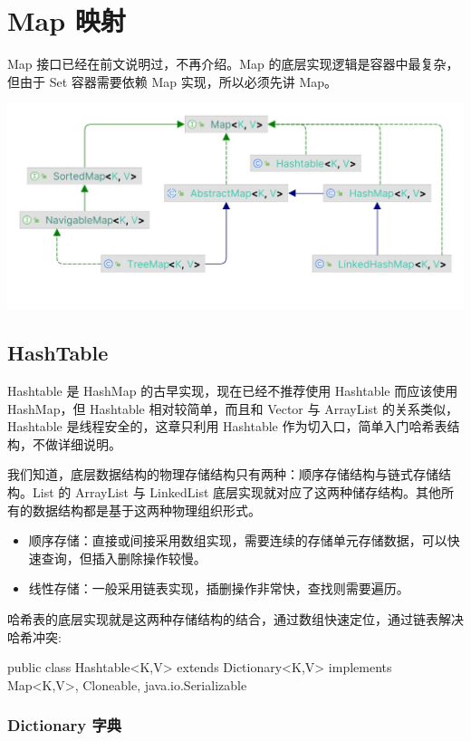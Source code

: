 \section{Map 映射}

Map 接口已经在前文说明过，不再介绍。Map 的底层实现逻辑是容器中最复杂，但由于 Set 容器需要依赖 Map 实现，所以必须先讲 Map。

\begin{center}
    \includegraphics[width=0.8\linewidth]{../../imgs/Map.jpg}
\end{center}

\subsection{HashTable}

Hashtable 是 HashMap 的古早实现，现在已经不推荐使用 Hashtable 而应该使用 HashMap，但 Hashtable 相对较简单，而且和 Vector 与 ArrayList 的关系类似，Hashtable 是线程安全的，这章只利用 Hashtable 作为切入口，简单入门哈希表结构，不做详细说明。

我们知道，底层数据结构的物理存储结构只有两种：顺序存储结构与链式存储结构。List 的 ArrayList 与 LinkedList 底层实现就对应了这两种储存结构。其他所有的数据结构都是基于这两种物理组织形式。

\begin{itemize}
    \item 顺序存储：直接或间接采用数组实现，需要连续的存储单元存储数据，可以快速查询，但插入删除操作较慢。
    \item 线性存储：一般采用链表实现，插删操作非常快，查找则需要遍历。
\end{itemize}

哈希表的底层实现就是这两种存储结构的结合，通过数组快速定位，通过链表解决哈希冲突:

\begin{Java}
public class Hashtable<K,V> extends Dictionary<K,V> implements Map<K,V>, Cloneable, java.io.Serializable
\end{Java}

\subsubsection{Dictionary 字典}

